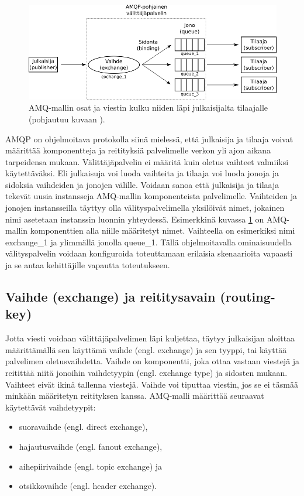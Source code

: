 \begin{figure}
	\includegraphics[width=1\textwidth]{pictures/amq-model-parts.png}
	\caption{AMQ-mallin osat ja viestin kulku niiden läpi julkaisijalta tilaajalle (pohjautuu kuvaan \cite[s.~11]{AMQP-specification}).}
	\label{fig:amq-model-parts}
\end{figure}

AMQP on ohjelmoitava protokolla siinä mielessä, että julkaisija ja tilaaja voivat määrittää komponentteja ja reitityksiä palvelimelle verkon yli ajon aikana tarpeidensa mukaan. Välittäjäpalvelin ei määritä kuin oletus vaihteet valmiiksi käytettäväksi. Eli julkaisuja voi luoda vaihteita ja tilaaja voi luoda jonoja ja sidoksia vaihdeiden ja jonojen välille. Voidaan sanoa että julkaisija ja tilaaja tekevät uusia instansseja AMQ-mallin komponenteista palvelimelle. Vaihteiden ja jonojen instansseilla täyttyy olla välityspalvelimella yksilöivät nimet, jokainen nimi asetetaan instanssin luonnin yhteydessä. Esimerkkinä kuvassa \ref{fig:amq-model-parts} on AMQ-mallin komponenttien alla niille määritetyt nimet. Vaihteella on esimerkiksi nimi exchange\_1 ja ylimmällä jonolla queue\_1. Tällä ohjelmoitavalla ominaisuudella välityspalvelin voidaan konfiguroida toteuttamaan erilaisia skenaarioita vapaasti ja se antaa kehittäjille vapautta toteutukseen.


\subsection{Vaihde (exchange) ja reititysavain (routing-key)}
Jotta viesti voidaan välittäjäpalvelimen läpi kuljettaa, täytyy julkaisijan aloittaa määrittämällä sen käyttämä vaihde (engl. exchange) ja sen tyyppi, tai käyttää palvelimen oletusvaihdetta. Vaihde on komponentti, joka ottaa vastaan viestejä ja reitittää niitä jonoihin vaihdetyypin (engl. exchange type) ja sidosten mukaan. Vaihteet eivät ikinä tallenna viestejä. Vaihde voi tiputtaa viestin, jos se ei täsmää minkään määritetyn reitityksen kanssa. AMQ-malli määrittää seuraavat käytettävät vaihdetyypit:
\begin{itemize}
	\item suoravaihde (engl. direct exchange),
	\item hajautusvaihde (engl. fanout exchange),
	\item aihepiirivaihde (engl. topic exchange) ja
	\item otsikkovaihde (engl. header exchange).
\end{itemize}


